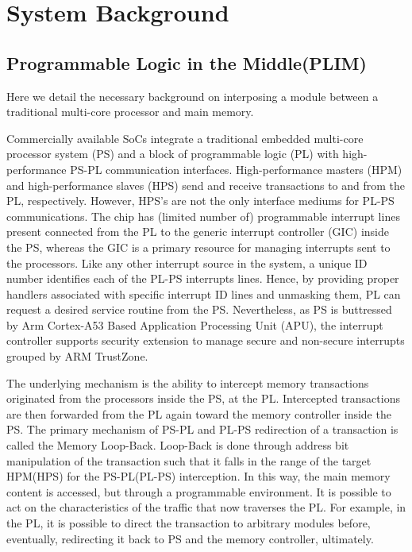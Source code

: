 \section{System Background}
\subsection{Programmable Logic in the Middle(PLIM)}
    Here we detail the necessary background on interposing a module between a traditional multi-core processor and main memory.

    Commercially available SoCs integrate a traditional embedded multi-core processor system (PS) and a block of programmable logic (PL) with high-performance PS-PL communication interfaces. High-performance masters (HPM) and high-performance slaves (HPS) send and receive transactions to and from the PL, respectively. However, HPS's are not the only interface mediums for PL-PS communications. The chip has (limited number of) programmable interrupt lines present connected from the PL to the generic interrupt controller (GIC) inside the PS, whereas the GIC is a primary resource for managing interrupts sent to the processors. Like any other interrupt source in the system, a unique ID number identifies each of the PL-PS interrupts lines. Hence, by providing proper handlers associated with specific interrupt ID lines and unmasking them, PL can request a desired service routine from the PS. Nevertheless, as PS is buttressed by Arm Cortex-A53 Based Application Processing Unit (APU), the interrupt controller supports security extension to manage secure and non-secure interrupts grouped by  ARM TrustZone.


    The underlying mechanism is the ability to intercept memory transactions originated from the processors inside the PS, at the PL. Intercepted transactions are then forwarded from the PL again toward the memory controller inside the PS. The primary mechanism of PS-PL and PL-PS redirection of a transaction is called the Memory Loop-Back. Loop-Back is done through address bit manipulation of the transaction such that it falls in the range of the target HPM(HPS) for the PS-PL(PL-PS) interception. In this way, the main memory content is accessed, but through a programmable environment. It is possible to act on the characteristics of the traffic that now traverses the PL. For example, in the PL, it is possible to direct the transaction to arbitrary modules before, eventually, redirecting it back to PS and the memory controller, ultimately.

